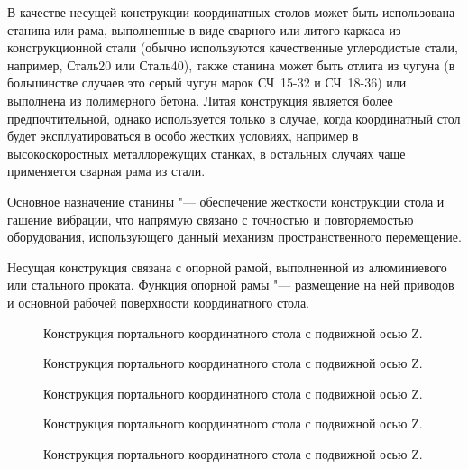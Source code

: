 В качестве несущей конструкции координатных столов может быть использована станина или рама, выполненные в виде сварного или литого каркаса из конструкционной стали (обычно используются качественные углеродистые стали, например, Сталь20 или Сталь40), также станина может быть отлита из чугуна (в большинстве случаев это серый чугун марок СЧ~15-32 и СЧ~18-36) или выполнена из полимерного бетона. Литая конструкция является более предпочтительной, однако используется только в случае, когда координатный стол будет эксплуатироваться в особо жестких условиях, например в высокоскоростных металлорежущих станках, в остальных случаях чаще применяется сварная рама из стали.

Основное назначение станины "--- обеспечение жесткости конструкции стола и гашение вибрации, что напрямую связано с точностью и повторяемостью оборудования, использующего данный механизм пространственного перемещение.

Несущая конструкция связана с опорной рамой, выполненной из алюминиевого или стального проката. Функция опорной рамы "--- размещение на ней приводов и основной рабочей поверхности координатного стола.

\begin{figure}[ht]
	\caption{Конструкция портального координатного стола с подвижной осью Z.}\label{fig:cnc-kin-1}
\end{figure}

\begin{figure}[ht]
	\caption{Конструкция портального координатного стола с подвижной осью Z.}\label{fig:cnc-kin-2}
\end{figure}

\begin{figure}[ht]
	\caption{Конструкция портального координатного стола с подвижной осью Z.}\label{fig:cnc-kin-3}
\end{figure}

\begin{figure}[ht]
	\caption{Конструкция портального координатного стола с подвижной осью Z.}\label{fig:cnc-kin-4}
\end{figure}

\begin{figure}[ht]
	\caption{Конструкция портального координатного стола с подвижной осью Z.}\label{fig:cnc-kin-5}
\end{figure}

